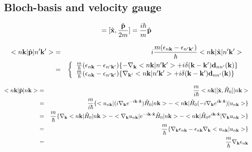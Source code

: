 \documentclass[aps,prb,preprint]{revtex4-1}
\begin{document}
\begin{appendix}
\section{Bloch-basis and velocity gauge}
\begin{eqnarray}
[\hat{\bf x}, \hat{H}_0] = [\hat{\bf x}, \frac{\hat{\bf p}}{2m}]  =\frac{i \hbar}{m}\hat{\bf p}
\end{eqnarray} 

\begin{eqnarray}
<n{\bf k}|\hat{\bf p}|n'{\bf k'}> &=&i \frac{m(\epsilon_{n{\bf k}}-\epsilon_{n'{\bf k'}})}{\hbar} <n{\bf k}|\hat{\bf x}|n'{\bf k'}> \nonumber \\
&=&\left\{
\begin{array}{l}
\frac{m}{\hbar}(\epsilon_{n{\bf k}}-\epsilon_{n'{\bf k'}})\{-\nabla_{\bf k} <n{\bf k}|n'{\bf k'}> + i \delta({\bf k-k'}) {\bf d}_{nn'}({\bf k})\}  \\
\frac{m}{\hbar}(\epsilon_{n{\bf k}}-\epsilon_{n'{\bf k'}})\{\nabla_{\bf k'} <n{\bf k}|n'{\bf k'}> + i \delta({\bf k-k'}) {\bf d}_{nn'}({\bf k})\} 
\end{array}
\right.
\end{eqnarray} 

\begin{eqnarray}
<n{\bf k}|\hat{\bf p}|n{\bf k}> &=& \frac{m}{i \hbar} <n{\bf k}|[\hat{\bf x},\hat{H}_0]|n{\bf k}> \nonumber \\
&=& \frac{m}{i \hbar} \{ <u_{n{\bf k}}| (i \nabla_{\bf k} e^{-i{\bf k \cdot \hat{x} }} ) \hat{H}_0 |n{\bf k}> - <n{\bf k}| \hat{H}_0 (-i\nabla_{\bf k} e^{i{\bf k \cdot \hat{x}} }) |u_{n{\bf k}}> \} \nonumber \\
&=& \frac{m}{\hbar} \{  \nabla_{\bf k} <n{\bf k}|\hat{H}_0|n{\bf k}> - <\nabla_{\bf k} u_{n{\bf k}}| e^{-i{\bf k \cdot \hat{x}} } \hat{H}_0  |n{\bf k}> - <n{\bf k}| \hat{H}_0 e^{i{\bf k \cdot \hat{x}} }|\nabla_{\bf k} u_{n{\bf k}}> \} \nonumber \\
&=& \frac{m}{\hbar} \{  \nabla_{\bf k} \epsilon_{n{\bf k}} -  \epsilon_{n{\bf k}} \nabla_{\bf k} <u_{n{\bf k}}| u_{n{\bf k}}>\}  \nonumber \\
&=& \frac{m}{\hbar} \nabla_{\bf k} \epsilon_{n{\bf k}}
\end{eqnarray} 


\end{appendix}
\end{document}
